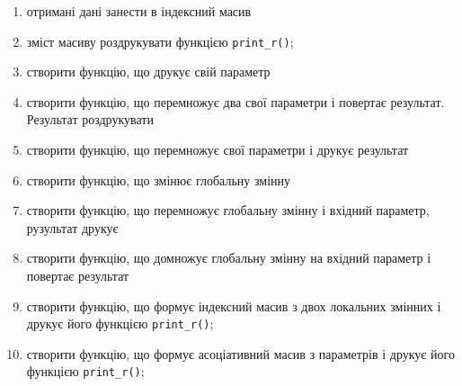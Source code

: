\begin{enumerate}
\item отримані дані занести в індексний масив
\item[]зміст масиву роздрукувати функцією \verb'print_r()'; 
\item створити функцію, що друкує свій параметр
\item створити функцію, що перемножує два свої параметри і повертає результат. Результат роздрукувати
\item створити функцію, що перемножує свої параметри і друкує результат
\item створити функцію, що змінює глобальну змінну
\item створити функцію, що перемножує глобальну змінну і вхідний параметр, рузультат друкує
\item створити функцію, що домножує глобальну змінну на вхідний параметр і повертає результат
\item створити функцію, що формує індексний масив з двох локальних змінних і друкує його функцією \verb'print_r()';
\item створити функцію, що формує асоціативний масив з параметрів і друкує його функцією \verb'print_r()';

\end{enumerate}



